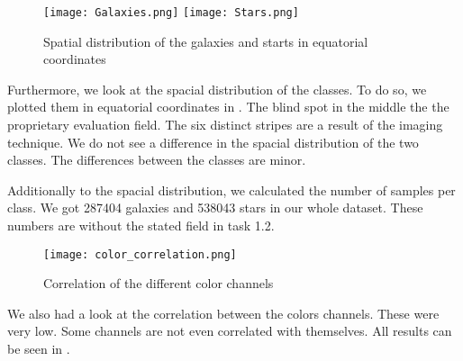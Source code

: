 \begin{figure}
    \texttt{[image: Galaxies.png]}
    \texttt{[image: Stars.png]}
    \caption{Spatial distribution of the galaxies and starts in equatorial coordinates}
    \label{distributionPlots}
\end{figure}
Furthermore, we look at the spacial distribution of the classes. To do so, we plotted them in equatorial coordinates in . The blind spot in the middle the the proprietary evaluation field. The six distinct stripes are a result of the imaging technique. We do not see a difference in the spacial distribution of the two classes. The differences between the classes are minor.

Additionally to the spacial distribution, we calculated the number of samples per class. We got 287404 galaxies and  538043 stars in our whole dataset. These numbers are without the stated field in task 1.2.

\begin{figure}
    \texttt{[image: color\_correlation.png]}
    \caption[short]{Correlation of the different color channels}
    \label{colorCorr}
\end{figure}
We also had a look at the correlation between the colors channels. These were very low. Some channels are not even correlated with themselves. All results can be seen in .
